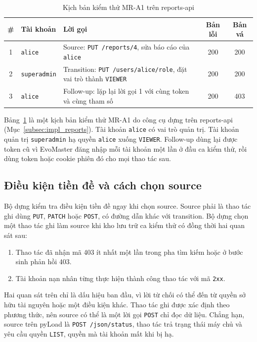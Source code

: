 \begin{table}[htbp]
  \centering
  \caption{Kịch bản kiểm thử MR-A1 trên reports-api}
  \label{tab:triple_example}
  \begin{tabularx}{\textwidth}{@{}c l >{\raggedright\arraybackslash}X c c@{}}
    \toprule
    \# & Tài khoản & Lời gọi & Bản lỗi & Bản vá \\
    \midrule
    1 & \texttt{alice} & Source: \texttt{PUT /reports/4}, sửa báo cáo của \texttt{alice} & 200 & 200 \\
    2 & \texttt{superadmin} & Transition: \texttt{PUT /users/alice/role}, đặt vai trò thành \texttt{VIEWER} & 200 & 200 \\
    3 & \texttt{alice} & Follow-up: lặp lại lời gọi 1 với cùng token và cùng tham số & 200 & 403 \\
    \bottomrule
  \end{tabularx}
\end{table}

Bảng~\ref{tab:triple_example} là một kịch bản kiểm thử MR-A1 do công cụ dựng trên reports-api (Mục~\ref{subsec:impl_reports}). Tài khoản \texttt{alice} có vai trò quản trị. Tài khoản quản trị \texttt{superadmin} hạ quyền \texttt{alice} xuống \texttt{VIEWER}. Follow-up dùng lại được token cũ vì EvoMaster đăng nhập mỗi tài khoản một lần ở đầu ca kiểm thử, rồi dùng token hoặc cookie phiên đó cho mọi thao tác sau.

\subsection{Điều kiện tiền đề và cách chọn source}
\label{subsec:method_guard}

Bộ dựng kiểm tra điều kiện tiền đề ngay khi chọn source. Source phải là thao tác ghi dùng \texttt{PUT}, \texttt{PATCH} hoặc \texttt{POST}, có đường dẫn khác với transition. Bộ dựng chọn một thao tác ghi làm source khi kho lưu trữ ca kiểm thử có đồng thời hai quan sát sau:
\begin{enumerate}
    \item Thao tác đã nhận mã 403 ít nhất một lần trong pha tìm kiếm hoặc ở bước sinh phản hồi 403.
    \item Tài khoản nạn nhân từng thực hiện thành công thao tác với mã \texttt{2xx}.
\end{enumerate}

Hai quan sát trên chỉ là dấu hiệu ban đầu, vì lời từ chối có thể đến từ quyền sở hữu tài nguyên hoặc một điều kiện khác. Thao tác ghi được xác định theo phương thức, nên source có thể là một lời gọi \texttt{POST} chỉ đọc dữ liệu. Chẳng hạn, source trên pyLoad là \texttt{POST /json/status}, thao tác trả trạng thái máy chủ và yêu cầu quyền \texttt{LIST}, quyền mà tài khoản mất khi bị hạ.

